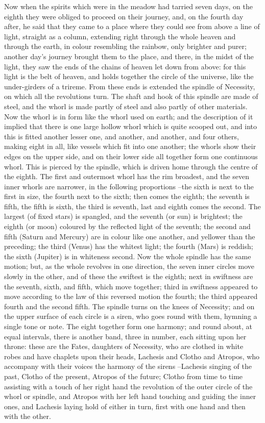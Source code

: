 Now when the spirits which were in the meadow had tarried seven days, on the eighth they were obliged to proceed on their journey, and, on the fourth day after, he said that they came to a place where they could see from above a line of light, straight as a column, extending right through the whole heaven and through the earth, in colour resembling the rainbow, only brighter and purer; another day's journey brought them to the place, and there, in the midst of the light, they saw the ends of the chains of heaven let down from above: for this light is the belt of heaven, and holds together the circle of the universe, like the under-girders of a trireme. From these ends is extended the spindle of Necessity, on which all the revolutions turn. The shaft and hook of this spindle are made of steel, and the whorl is made partly of steel and also partly of other materials. Now the whorl is in form like the whorl used on earth; and the description of it implied that there is one large hollow whorl which is quite scooped out, and into this is fitted another lesser one, and another, and another, and four others, making eight in all, like vessels which fit into one another; the whorls show their edges on the upper side, and on their lower side all together form one continuous whorl. This is pierced by the spindle, which is driven home through the centre of the eighth. The first and outermost whorl has the rim broadest, and the seven inner whorls are narrower, in the following proportions --the sixth is next to the first in size, the fourth next to the sixth; then comes the eighth; the seventh is fifth, the fifth is sixth, the third is seventh, last and eighth comes the second. The largest (of fixed stars) is spangled, and the seventh (or sun) is brightest; the eighth (or moon) coloured by the reflected light of the seventh; the second and fifth (Saturn and Mercury) are in colour like one another, and yellower than the preceding; the third (Venus) has the whitest light; the fourth (Mars) is reddish; the sixth (Jupiter) is in whiteness second. Now the whole spindle has the same motion; but, as the whole revolves in one direction, the seven inner circles move slowly in the other, and of these the swiftest is the eighth; next in swiftness are the seventh, sixth, and fifth, which move together; third in swiftness appeared to move according to the law of this reversed motion the fourth; the third appeared fourth and the second fifth. The spindle turns on the knees of Necessity; and on the upper surface of each circle is a siren, who goes round with them, hymning a single tone or note. The eight together form one harmony; and round about, at equal intervals, there is another band, three in number, each sitting upon her throne: these are the Fates, daughters of Necessity, who are clothed in white robes and have chaplets upon their heads, Lachesis and Clotho and Atropos, who accompany with their voices the harmony of the sirens --Lachesis singing of the past, Clotho of the present, Atropos of the future; Clotho from time to time assisting with a touch of her right hand the revolution of the outer circle of the whorl or spindle, and Atropos with her left hand touching and guiding the inner ones, and Lachesis laying hold of either in turn, first with one hand and then with the other.

